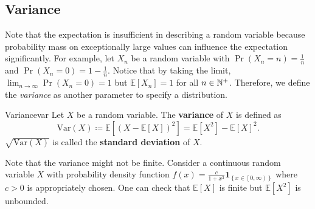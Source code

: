 \documentclass[math, code]{amznotes}
\theoremstyle{remark}
\begin{document}
\subsection{Variance}
Note that the expectation is insufficient in describing a random variable because probability mass on exceptionally large values can influence the expectation significantly. For example, let $X_n$ be a random variable with $\Pr\left(X_n = n\right) = \frac{1}{n}$ and $\Pr\left(X_n = 0\right) = 1 - \frac{1}{n}$. Notice that by taking the limit, $\lim_{n \to \infty}\Pr\left(X_n = 0\right) = 1$ but $\mathbb{E}\left[X_n\right] = 1$ for all $n \in \mathbb{N}^+$. Therefore, we define the \textit{variance} as another parameter to specify a distribution.
\begin{dfnbox}{Variance}{var}
    Let $X$ be a random variable. The {\color{red} \textbf{variance}} of $X$ is defined as 
    \begin{equation*}
        \mathrm{Var}\left(X\right) \coloneqq \mathbb{E}\left[\left(X - \mathbb{E}\left[X\right]\right)^2\right] = \mathbb{E}\left[X^2\right] - \mathbb{E}\left[X\right]^2.
    \end{equation*}
    $\sqrt{\mathrm{Var}\left(X\right)}$ is called the {\color{red} \textbf{standard deviation}} of $X$.
\end{dfnbox}
Note that the variance might not be finite. Consider a continuous random variable $X$ with probability density function $f\left(x\right) = \frac{c}{1 + x^3}\mathbf{1}_{\left\{x \in \left[0, \infty\right)\right\}}$ where $c > 0$ is appropriately chosen. One can check that $\mathbb{E}\left[X\right]$ is finite but $\mathbb{E}\left[X^2\right]$ is unbounded.
\end{document}
